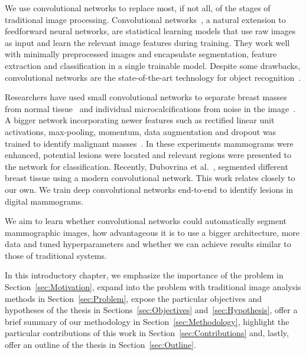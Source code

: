We use convolutional networks to replace most, if not all, of the stages of traditional image processing. 
Convolutional networks~\cite{Fukushima1980,LeCun1998}, a natural extension to feedforward neural networks, are statistical learning models that use raw images as input and learn the relevant image features during training. They work well with minimally preprocessed images and encapsulate segmentation, feature extraction and classification in a single trainable model. Despite some drawbacks, convolutional networks are the state-of-the-art technology for object recognition~\cite{Russakovsky2015}.

Researchers have used small convolutional networks to separate breast masses from normal tissue~\cite{Sahiner1996} and individual microcalcifications from noise in the image~\cite{Lo1995, Ge2007}. A bigger network incorporating newer features such as rectified linear unit activations, max-pooling, momentum, data augmentation and dropout was trained to identify malignant masses~\cite{Arevalo2015}. In these experiments mammograms were enhanced, potential lesions were located and relevant regions were presented to the network for classification.
Recently, Dubovrina et al.~\cite{Dubrovina2015}, segmented different breast tissue using a modern convolutional network. This work relates closely to our own. We train deep convolutional networks end-to-end to identify lesions in digital mammograms.%

We aim to learn whether convolutional networks could automatically segment mammographic images, how advantageous it is to use a bigger architecture, more data and tuned hyperparameters and whether we can achieve results similar to those of traditional systems.

In this introductory chapter, we emphasize the importance of the problem in Section~\ref{sec:Motivation}, expand into the problem with traditional image analysis methods in Section~\ref{sec:Problem}, expose the particular objectives and hypotheses of the thesis in Sections~\ref{sec:Objectives} and~\ref{sec:Hypothesis}, offer a brief summary of our methodology in Section~\ref{sec:Methodology}, highlight the particular contributions of this work in Section~\ref{sec:Contributions} and, lastly, offer an outline of the thesis in Section~\ref{sec:Outline}.
